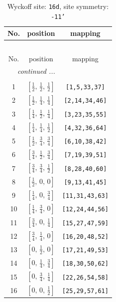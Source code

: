 \documentclass[fleqn,8pt]{jsarticle}
\begin{document}
\renewcommand{\arraystretch}{1.2}
\begin{longtable}{ccc}
\caption{Wyckoff site: {\tt 16d}, site symmetry: {\tt -11'}}
 \\
 \hline \hline
No. & position & mapping \\ \hline \endfirsthead

\multicolumn{2}{l}{\tablename\ \thetable{}} \\
 \hline \hline
No. & position & mapping \\ \hline \endhead

 \hline \hline
\multicolumn{2}{r}{\footnotesize\it continued ...} \\ \endfoot

 \hline \hline
\multicolumn{2}{r}{} \\ \endlastfoot

1 & $\left[ \frac{1}{2},\, \frac{1}{2},\, \frac{1}{2} \right]$ & {\tt [1,5,33,37]} \\ \hline
2 & $\left[ \frac{1}{2},\, \frac{1}{4},\, \frac{1}{4} \right]$ & {\tt [2,14,34,46]} \\ \hline
3 & $\left[ \frac{1}{4},\, \frac{1}{2},\, \frac{1}{4} \right]$ & {\tt [3,23,35,55]} \\ \hline
4 & $\left[ \frac{1}{4},\, \frac{1}{4},\, \frac{1}{2} \right]$ & {\tt [4,32,36,64]} \\ \hline
5 & $\left[ \frac{1}{2},\, \frac{3}{4},\, \frac{3}{4} \right]$ & {\tt [6,10,38,42]} \\ \hline
6 & $\left[ \frac{3}{4},\, \frac{1}{2},\, \frac{3}{4} \right]$ & {\tt [7,19,39,51]} \\ \hline
7 & $\left[ \frac{3}{4},\, \frac{3}{4},\, \frac{1}{2} \right]$ & {\tt [8,28,40,60]} \\ \hline
8 & $\left[ \frac{1}{2},\, 0,\, 0 \right]$ & {\tt [9,13,41,45]} \\ \hline
9 & $\left[ \frac{1}{4},\, 0,\, \frac{3}{4} \right]$ & {\tt [11,31,43,63]} \\ \hline
10 & $\left[ \frac{1}{4},\, \frac{3}{4},\, 0 \right]$ & {\tt [12,24,44,56]} \\ \hline
11 & $\left[ \frac{3}{4},\, 0,\, \frac{1}{4} \right]$ & {\tt [15,27,47,59]} \\ \hline
12 & $\left[ \frac{3}{4},\, \frac{1}{4},\, 0 \right]$ & {\tt [16,20,48,52]} \\ \hline
13 & $\left[ 0,\, \frac{1}{2},\, 0 \right]$ & {\tt [17,21,49,53]} \\ \hline
14 & $\left[ 0,\, \frac{1}{4},\, \frac{3}{4} \right]$ & {\tt [18,30,50,62]} \\ \hline
15 & $\left[ 0,\, \frac{3}{4},\, \frac{1}{4} \right]$ & {\tt [22,26,54,58]} \\ \hline
16 & $\left[ 0,\, 0,\, \frac{1}{2} \right]$ & {\tt [25,29,57,61]} \\
\end{longtable}
\end{document}
